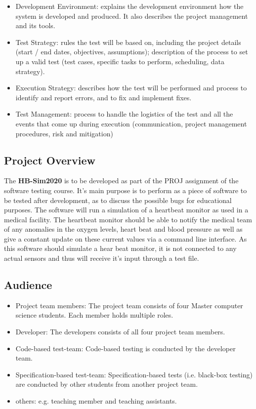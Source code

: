 \documentclass[a4paper]{article}
\begin{document}
\begin{itemize}
    \item Development Environment: explains the development environment how the system is developed and produced. It also describes the project management and its tools.
    \item Test Strategy: rules the test will be based on, including the project details (start / end dates, objectives, assumptions); description of the process to set up a valid test (test cases, specific tasks to perform, scheduling, data strategy).
    \item Execution Strategy: describes how the test will be performed and process to identify and report errors, and to fix and implement fixes.
    \item Test Management: process to handle the logistics of the test and all the events that come up during execution (communication, project management procedures, risk and mitigation)
\end{itemize}

\subsection{Project Overview}
The \textbf{HB-Sim2020} is to be developed as part of the PROJ assignment of the software testing course. It's main purpose is to perform as a piece of software to be tested after development, as to discuss the possible bugs for educational purposes. The software will run a simulation of a heartbeat monitor as used in a medical facility. The heartbeat monitor should be able to notify the medical team of any anomalies in the oxygen levels, heart beat and blood pressure as well as give a constant update on these current values via a command line interface. As this software should simulate a hear beat monitor, it is not connected to any actual sensors and thus will receive it's input through a test file.

\subsection{Audience}
\begin{itemize}
    \item Project team members: The project team consists of four Master computer science students. Each member holds multiple roles.
    \item Developer: The developers consists of all four project team members.
    \item Code-based test-team: Code-based testing is conducted by the developer team.
    \item Specification-based test-team: Specification-based tests (i.e. black-box testing) are conducted by other students from another project team.
    \item others: e.g. teaching member and teaching assistants. 
\end{itemize}
\end{document}
